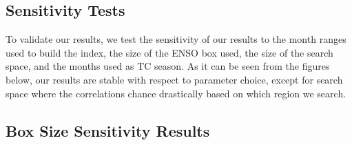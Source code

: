\documentclass[]{article}
\begin{document}
% 

\subsection{Sensitivity Tests}
To validate our results, we test the sensitivity of our results to the month ranges used to build the index, the size of the ENSO box used, the size of the search space, and the months used as TC season. As it can be seen from the figures below, our results are stable with respect to parameter choice, except for search space where the correlations chance drastically based on which region we search.
\subsection{Box Size Sensitivity Results}
\end{document}
